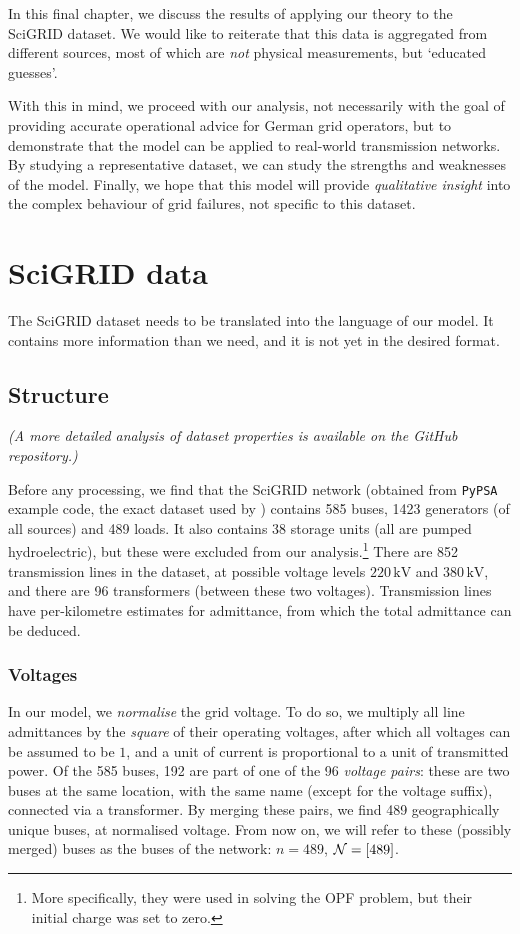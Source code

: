 \documentclass[main.tex]{subfiles}
\begin{document}
In this final chapter, we discuss the results of applying our theory to the SciGRID dataset. We would like to reiterate that this data is aggregated from different sources, most of which are \emph{not} physical measurements, but `educated guesses'.

With this in mind, we proceed with our analysis, not necessarily with the goal of providing accurate operational advice for German grid operators, but to demonstrate that the model can be applied to real-world transmission networks. By studying a representative dataset, we can study the strengths and weaknesses of the model. Finally, we hope that this model will provide \emph{qualitative insight} into the complex behaviour of grid failures, not specific to this dataset.

\section{SciGRID data}
The SciGRID dataset needs to be translated into the language of our model. It contains more information than we need, and it is not yet in the desired format. 

\subsection{Structure}
\emph{(A more detailed analysis of dataset properties is available on the GitHub repository.)}

Before any processing, we find that the SciGRID network (obtained from \texttt{PyPSA} example code, the exact dataset used by \cite{Nesti2018emergentfailures}) contains 585 buses, 1423 generators (of all sources) and 489 loads. It also contains 38 storage units (all are pumped hydroelectric), but these were excluded from our analysis.\footnote{More specifically, they were used in solving the OPF problem, but their initial charge was set to zero.} There are 852 transmission lines in the dataset, at possible voltage levels $220 \, \si{\kilo\volt}$ and $380 \, \si{\kilo\volt}$, and there are 96 transformers (between these two voltages). Transmission lines have per-kilometre estimates for admittance, from which the total admittance can be deduced.

\subsubsection{Voltages}
In our model, we \emph{normalise} the grid voltage. To do so, we multiply all line admittances by the \emph{square} of their operating voltages, after which all voltages can be assumed to be $1$, and a unit of current is proportional to a unit of transmitted power. Of the 585 buses, 192 are part of one of the 96 \emph{voltage pairs}: these are two buses at the same location, with the same name (except for the voltage suffix), connected via a transformer. By merging these pairs, we find 489 geographically unique buses, at normalised voltage. From now on, we will refer to these (possibly merged) buses as the buses of the network: $n=489$, $\mathcal{N} = [489]$.
\end{document}
